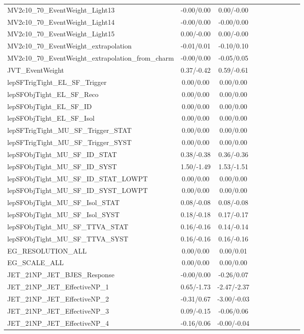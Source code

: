 \begin{table}[h]
\begin{center}
\begin{tabular}{l|ccccccccc}
MV2c10\_70\_EventWeight\_Light13 &-0.00/0.00 &0.00/-0.00 \\
MV2c10\_70\_EventWeight\_Light14 &-0.00/0.00 &-0.00/0.00 \\
MV2c10\_70\_EventWeight\_Light15 &0.00/-0.00 &0.00/-0.00 \\
MV2c10\_70\_EventWeight\_extrapolation &-0.01/0.01 &-0.10/0.10 \\
MV2c10\_70\_EventWeight\_extrapolation\_from\_charm &-0.00/0.00 &-0.05/0.05 \\
JVT\_EventWeight &0.37/-0.42 &0.59/-0.61 \\
lepSFTrigTight\_EL\_SF\_Trigger &0.00/0.00 &0.00/0.00 \\
lepSFObjTight\_EL\_SF\_Reco &0.00/0.00 &0.00/0.00 \\
lepSFObjTight\_EL\_SF\_ID &0.00/0.00 &0.00/0.00 \\
lepSFObjTight\_EL\_SF\_Isol &0.00/0.00 &0.00/0.00 \\
lepSFTrigTight\_MU\_SF\_Trigger\_STAT &0.00/0.00 &0.00/0.00 \\
lepSFTrigTight\_MU\_SF\_Trigger\_SYST &0.00/0.00 &0.00/0.00 \\
lepSFObjTight\_MU\_SF\_ID\_STAT &0.38/-0.38 &0.36/-0.36 \\
lepSFObjTight\_MU\_SF\_ID\_SYST &1.50/-1.49 &1.53/-1.51 \\
lepSFObjTight\_MU\_SF\_ID\_STAT\_LOWPT &0.00/0.00 &0.00/0.00 \\
lepSFObjTight\_MU\_SF\_ID\_SYST\_LOWPT &0.00/0.00 &0.00/0.00 \\
lepSFObjTight\_MU\_SF\_Isol\_STAT &0.08/-0.08 &0.08/-0.08 \\
lepSFObjTight\_MU\_SF\_Isol\_SYST &0.18/-0.18 &0.17/-0.17 \\
lepSFObjTight\_MU\_SF\_TTVA\_STAT &0.16/-0.16 &0.14/-0.14 \\
lepSFObjTight\_MU\_SF\_TTVA\_SYST &0.16/-0.16 &0.16/-0.16 \\
EG\_RESOLUTION\_ALL &0.00/0.00 &0.00/0.01 \\
EG\_SCALE\_ALL &0.00/0.00 &0.00/0.00 \\
JET\_21NP\_JET\_BJES\_Response &-0.00/0.00 &-0.26/0.07 \\
JET\_21NP\_JET\_EffectiveNP\_1 &0.65/-1.73 &-2.47/-2.37 \\
JET\_21NP\_JET\_EffectiveNP\_2 &-0.31/0.67 &-3.00/-0.03 \\
JET\_21NP\_JET\_EffectiveNP\_3 &0.09/-0.15 &-0.06/0.06 \\
JET\_21NP\_JET\_EffectiveNP\_4 &-0.16/0.06 &-0.00/-0.04 \\

\end{tabular}
\end{center}
\end{table}
